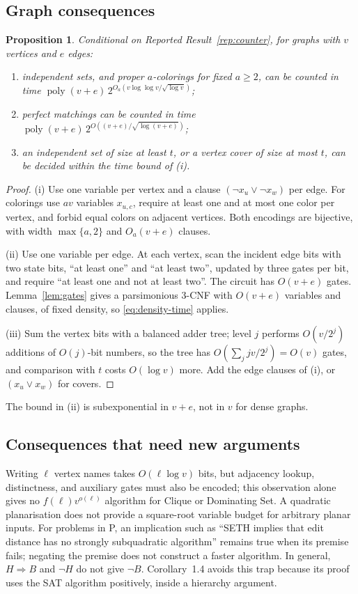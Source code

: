 \documentclass[11pt,reqno]{amsart}
\numberwithin{equation}{section}
\theoremstyle{plain}
\newtheorem{proposition}[theorem]{Proposition}
\theoremstyle{definition}
\theoremstyle{remark}
\newcommand{\poly}{\operatorname{poly}}
\begin{document}
\subsection{Graph consequences}
\begin{proposition}\label{prop:graphs}
Conditional on Reported Result~\ref{rep:counter}, for graphs with $v$
vertices and $e$ edges:
\begin{enumerate}[label=(\roman*)]
\item independent sets, and proper $a$-colorings for fixed $a\ge2$, can be
 counted in time $\poly(v+e)\,2^{O_a(v\log\log v/\sqrt{\log v})}$;
\item perfect matchings can be counted in time
 $\poly(v+e)\,2^{O((v+e)/\sqrt{\log(v+e)})}$;
\item an independent set of size at least $t$, or a vertex cover of size at
 most $t$, can be decided within the time bound of (i).
\end{enumerate}
\end{proposition}
\begin{proof}
(i) Use one variable per vertex and a clause $(\neg x_u\lor\neg x_w)$ per
edge. For colorings use $av$ variables $x_{u,c}$, require at least one and at
most one color per vertex, and forbid equal colors on adjacent vertices. Both
encodings are bijective, with width $\max\{a,2\}$ and $O_a(v+e)$ clauses.

(ii) Use one variable per edge. At each vertex, scan the incident edge bits
with two state bits, ``at least one'' and ``at least two'', updated by three
gates per bit, and require ``at least one and not at least two''. The circuit
has $O(v+e)$ gates. Lemma~\ref{lem:gates} gives a parsimonious 3-CNF with
$O(v+e)$ variables and clauses, of fixed density, so
\eqref{eq:density-time} applies.

(iii) Sum the vertex bits with a balanced adder tree; level $j$ performs
$O(v/2^j)$ additions of $O(j)$-bit numbers, so the tree has
$O(\sum_jjv/2^j)=O(v)$ gates, and comparison with $t$ costs $O(\log v)$
more. Add the edge clauses of (i), or $(x_u\lor x_w)$ for covers.
\end{proof}
The bound in (ii) is subexponential in $v+e$, not in $v$ for dense graphs.

\subsection{Consequences that need new arguments}
Writing $\ell$ vertex names takes $O(\ell\log v)$ bits, but adjacency lookup,
distinctness, and auxiliary gates must also be encoded; this observation
alone gives no $f(\ell)v^{o(\ell)}$ algorithm for Clique or Dominating Set. A
quadratic planarisation does not provide a square-root variable budget for
arbitrary planar inputs. For problems in P, an implication such as
``SETH implies that edit distance has no strongly subquadratic algorithm''
\cite{BackursIndyk} remains true when its premise fails; negating the premise
does not construct a faster algorithm. In general, $H\Rightarrow B$ and
$\neg H$ do not give $\neg B$. Corollary~1.4 avoids this trap because its
proof uses the SAT algorithm positively, inside a hierarchy argument.
\end{document}

